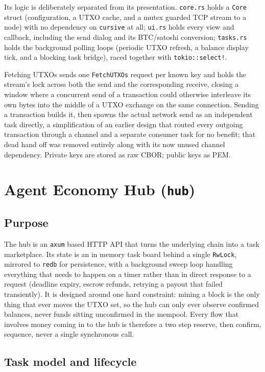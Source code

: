\documentclass[11pt]{article}
\newcommand{\code}[1]{\texttt{#1}}
\begin{document}
Its logic is deliberately separated from its presentation. \code{core.rs} holds a \code{Core} struct (configuration, a UTXO cache, and a mutex guarded TCP stream to a node) with no dependency on \code{cursive} at all; \code{ui.rs} holds every view and callback, including the send dialog and its BTC/satoshi conversion; \code{tasks.rs} holds the background polling loops (periodic UTXO refresh, a balance display tick, and a blocking task bridge), raced together with \code{tokio::select!}.

Fetching UTXOs sends one \code{FetchUTXOs} request per known key and holds the stream's lock across both the send and the corresponding receive, closing a window where a concurrent send of a transaction could otherwise interleave its own bytes into the middle of a UTXO exchange on the same connection. Sending a transaction builds it, then spawns the actual network send as an independent task directly, a simplification of an earlier design that routed every outgoing transaction through a channel and a separate consumer task for no benefit; that dead hand off was removed entirely along with its now unused channel dependency. Private keys are stored as raw CBOR; public keys as PEM.

\section{Agent Economy Hub (\code{hub})}
\label{sec:hub}

\subsection{Purpose}

The hub is an \code{axum} based HTTP API that turns the underlying chain into a task marketplace. Its state is an in memory task board behind a single \code{RwLock}, mirrored to \code{redb} for persistence, with a background sweep loop handling everything that needs to happen on a timer rather than in direct response to a request (deadline expiry, escrow refunds, retrying a payout that failed transiently). It is designed around one hard constraint: mining a block is the only thing that ever moves the UTXO set, so the hub can only ever observe confirmed balances, never funds sitting unconfirmed in the mempool. Every flow that involves money coming in to the hub is therefore a two step reserve, then confirm, sequence, never a single synchronous call.

\subsection{Task model and lifecycle}
\end{document}
